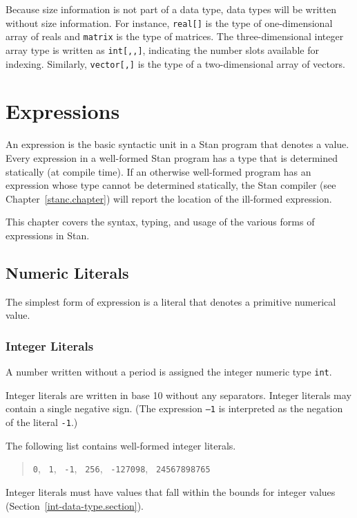 \documentclass[10pt]{report}
\newcommand{\Stan}{Stan\xspace}
\newcommand{\code}[1]{{\tt #1}}
\newcommand{\refchapter}[1]{Chapter~\ref{#1.chapter}}
\newcommand{\refsection}[1]{Section~\ref{#1.section}}
\begin{document}
Because size information is not part of a data type, data
types will be written without size information.  For instance,
\code{real[]} is the type of one-dimensional array of reals and
\code{matrix} is the type of matrices.  The three-dimensional integer
array type is written as \code{int[,,]}, indicating the number slots
available for indexing.  Similarly, \code{vector[,]} is the type of a
two-dimensional array of vectors.





\chapter{Expressions}

An expression is the basic syntactic unit in a \Stan program that
denotes a value.  Every expression in a well-formed \Stan program has
a type that is determined statically (at compile time).  If an
otherwise well-formed program has an expression whose type cannot be
determined statically, the \Stan compiler (see \refchapter{stanc})
will report the location of the ill-formed expression.

This chapter covers the syntax, typing, and usage of the various forms
of expressions in \Stan. 

\section{Numeric Literals}

The simplest form of expression is a literal that denotes a primitive
numerical value.   

\subsection{Integer Literals}

A number written without a period is assigned the integer numeric type
\code{int}.

Integer literals are written in base 10 without any separators.
Integer literals may contain a single negative sign.  (The expression
\code{--1} is interpreted as the negation of the literal \code{-1}.)

The following list contains well-formed integer literals.
%
\begin{quote}
\code{0}, \ \code{1}, \ \code{-1}, \ \code{256}, 
\ \code{-127098}, \ \code{24567898765}
\end{quote}
%
Integer literals must have values that fall within the bounds for
integer values (\refsection{int-data-type}).
\end{document}

